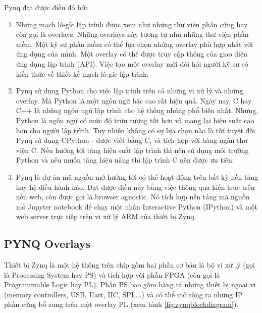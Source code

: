 		Pynq đạt được điều đó bởi:
		\begin{enumerate}
			\item Những mạch lô-gíc lập trình được xem như những thư viện phần cứng hay còn gọi là overlays. Những overlays này tương tự như những thư viện phần mềm. Một kỹ sư phần mềm có thể lựa chọn những overlay phù hợp nhất với ứng dụng của mình. Một overlay có thể được truy cập thông của giao diện ứng dụng lập trình (API). Việc tạo một overlay mới đòi hỏi người kỹ sư có kiến thức về thiết kế mạch lô-gíc lập trình.
			\item Pynq sử dụng Python cho việc lập trình trên cả những vi xử lý và những overlay. Mà Python là một ngôn ngữ bậc cao rất hiệu quả. Ngày nay, C hay C++ là nhũng ngôn ngữ lập trình cho hệ thống nhúng phổ biến nhất. Nhưng, Python là ngôn ngữ có mức độ trừu tượng tốt hơn và mang lại hiệu suất cao hơn cho người lập trình. Tuy nhiên không có sự lựa chọn nào là tốt tuyệt đối. Pynq sử dụng CPython - được viết bằng C, và tích hợp với hàng ngàn thư viện C. Nếu hướng tới tăng hiệu suất lập trình thì nên sử dụng môi trường Python và nếu muốn tăng hiệu năng thì lập trình C nên được ưu tiên.
			\item Pynq là dự án mã nguồn mở hướng tới có thể hoạt động 	trên bất kỳ nền tảng hay hệ điều hành nào. Đạt được điều này bằng việc thông qua kiến trúc trên nền web, còn được gọi là browser agnostic. Nó tích hợp nền tảng mã nguồn mở Jupyter notebook để chạy một nhân Interactive Python (IPython) và một web server trực tiếp trên vi xử lý ARM của thiết bị Zynq.
		\end{enumerate}
        
        \subsection{PYNQ Overlays}\label{subsec:overlayintro}

        Thiết bị Zynq là một hệ thống trên chíp gồm hai phần cơ bản là bộ vi xử lý (gọi là Processing System hay PS) và tích hợp với phần FPGA (còn gọi là Programmable Logic hay PL). Phần PS bao gồm hàng tá những thiết bị ngoại vi (memory controllers, USB, Uart, IIC, SPI,...) và có thể mở rộng ra những IP phần cứng bổ sung trên một overlay PL (xem hình \ref{fig:zynqblockdiagram}).

